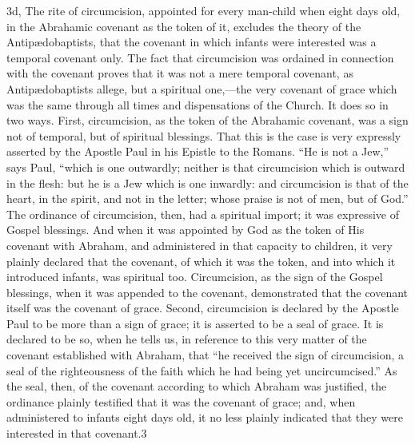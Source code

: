 \documentclass[]{book}
\begin{document}
3d, The rite of circumcision, appointed for every man-child when eight days old, in the Abrahamic covenant as the token of it, excludes the theory of the Antipædobaptists, that the covenant in which infants were interested was a temporal covenant only. The fact that circumcision was ordained in connection with the covenant proves that it was not a mere temporal covenant, as Antipædobaptists allege, but a spiritual one,---the very covenant of grace which was the same through all times and dispensations of the Church. It does so in two ways. First, circumcision, as the token of the Abrahamic covenant, was a sign not of temporal, but of spiritual blessings. That this is the case is very expressly asserted by the Apostle Paul in his Epistle to the Romans. ``He is not a Jew,'' says Paul, ``which is one outwardly; neither is that circumcision which is outward in the flesh: but he is a Jew which is one inwardly: and circumcision is that of the heart, in the spirit, and not in the letter; whose praise is not of men, but of God.'' The ordinance of circumcision, then, had a spiritual import; it was expressive of Gospel blessings. And when it was appointed by God as the token of His covenant with Abraham, and administered in that capacity to children, it very plainly declared that the covenant, of which it was the token, and into which it introduced infants, was spiritual too. Circumcision, as the sign of the Gospel blessings, when it was appended to the covenant, demonstrated that the covenant itself was the covenant of grace. Second, circumcision is declared by the Apostle Paul to be more than a sign of grace; it is asserted to be a seal of grace. It is declared to be so, when he tells us, in reference to this very matter of the covenant established with Abraham, that ``he received the sign of circumcision, a seal of the righteousness of the faith which he had being yet uncircumcised.'' As the seal, then, of the covenant according to which Abraham was justified, the ordinance plainly testified that it was the covenant of grace; and, when administered to infants eight days old, it no less plainly indicated that they were interested in that covenant.3
\end{document}
